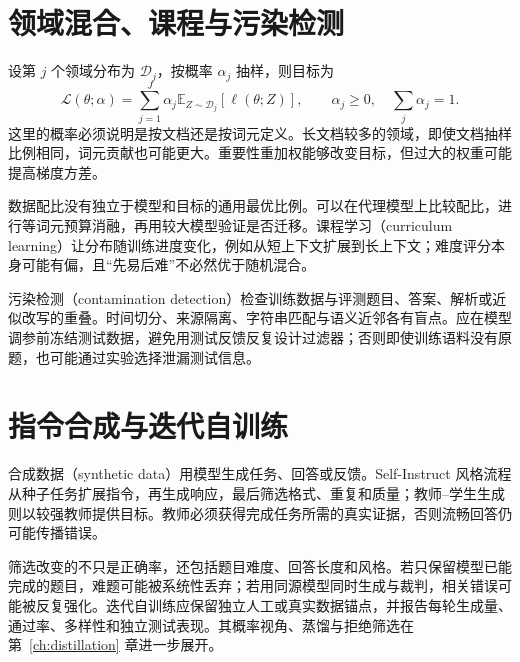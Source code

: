 \section{领域混合、课程与污染检测}

设第 $j$ 个领域分布为 $\mathcal D_j$，按概率 $\alpha_j$ 抽样，则目标为
\[
\mathcal L(\theta;\alpha)=\sum_{j=1}^J\alpha_j\mathbb E_{Z\sim\mathcal D_j}[\ell(\theta;Z)],
\qquad \alpha_j\ge0,\quad \sum_j\alpha_j=1.
\]
这里的概率必须说明是按文档还是按词元定义。长文档较多的领域，即使文档抽样比例相同，词元贡献也可能更大。重要性重加权能够改变目标，但过大的权重可能提高梯度方差。

数据配比没有独立于模型和目标的通用最优比例。可以在代理模型上比较配比，进行等词元预算消融，再用较大模型验证是否迁移。课程学习（curriculum learning）让分布随训练进度变化，例如从短上下文扩展到长上下文；难度评分本身可能有偏，且“先易后难”不必然优于随机混合。

污染检测（contamination detection）检查训练数据与评测题目、答案、解析或近似改写的重叠。时间切分、来源隔离、字符串匹配与语义近邻各有盲点。应在模型调参前冻结测试数据，避免用测试反馈反复设计过滤器；否则即使训练语料没有原题，也可能通过实验选择泄漏测试信息。

\section{指令合成与迭代自训练}

合成数据（synthetic data）用模型生成任务、回答或反馈。Self-Instruct 风格流程从种子任务扩展指令，再生成响应，最后筛选格式、重复和质量；教师--学生生成则以较强教师提供目标。教师必须获得完成任务所需的真实证据，否则流畅回答仍可能传播错误。

筛选改变的不只是正确率，还包括题目难度、回答长度和风格。若只保留模型已能完成的题目，难题可能被系统性丢弃；若用同源模型同时生成与裁判，相关错误可能被反复强化。迭代自训练应保留独立人工或真实数据锚点，并报告每轮生成量、通过率、多样性和独立测试表现。其概率视角、蒸馏与拒绝筛选在第~\ref{ch:distillation} 章进一步展开。

